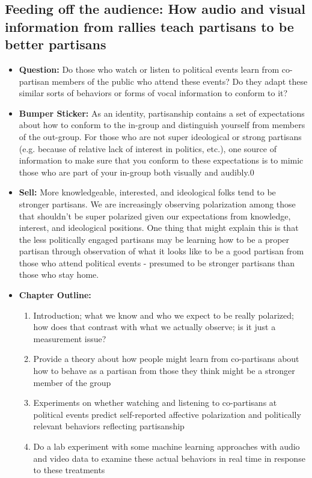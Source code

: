 \documentclass[12pt]{article}
\begin{document}
\subsection{Feeding off the audience: How audio and visual information from rallies teach partisans to be better partisans}
    \begin{itemize}
        \item \textbf{Question:} Do those who watch or listen to political events learn from co-partisan members of the public who attend these events? Do they adapt these similar sorts of behaviors or forms of vocal information to conform to it?
        \item \textbf{Bumper Sticker:} As an identity, partisanship contains a set of expectations about how to conform to the in-group and distinguish yourself from members of the out-group. For those who are not super ideological or strong partisans (e.g. because of relative lack of interest in politics, etc.), one source of information to make sure that you conform to these expectations is to mimic those who are part of your in-group both visually and audibly.0
        \item \textbf{Sell:} More knowledgeable, interested, and ideological folks tend to be stronger partisans. We are increasingly observing polarization among those that shouldn't be super polarized given our expectations from knowledge, interest, and ideological positions. One thing that might explain this is that the less politically engaged partisans may be learning how to be a proper partisan through observation of what it looks like to be a good partisan from those who attend political events - presumed to be stronger partisans than those who stay home. 
        \item \textbf{Chapter Outline:}
        \begin{enumerate}
            \item Introduction; what we know and who we expect to be really polarized; how does that contrast with what we actually observe; is it just a measurement issue?
            \item Provide a theory about how people might learn from co-partisans about how to behave as a partisan from those they think might be a stronger member of the group
            \item Experiments on whether watching and listening to co-partisans at political events predict self-reported affective polarization and politically relevant behaviors reflecting partisanship
            \item Do a lab experiment with some machine learning approaches with audio and video data to examine these actual behaviors in real time in response to these treatments

\end{enumerate}
\end{itemize}
\end{document}
